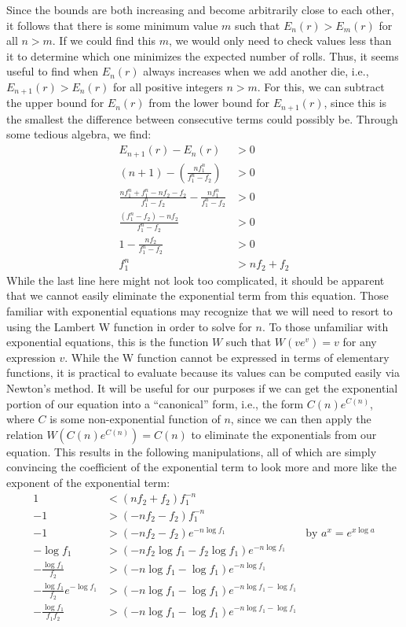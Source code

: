 \documentclass{article}
\begin{document}
Since the bounds are both increasing and become arbitrarily close to each other, it follows that there is some minimum value $m$ such that $E_n(r) > E_m(r)$ for all $n > m$.
If we could find this $m$, we would only need to check values less than it to determine which one minimizes the expected number of rolls.
Thus, it seems useful to find when $E_n(r)$ always increases when we add another die, i.e., $E_{n+1}(r) > E_n(r)$ for all positive integers $n > m$.
For this, we can subtract the upper bound for $E_n(r)$ from the lower bound for $E_{n+1}(r)$, since this is the smallest the difference between consecutive terms could possibly be.
Through some tedious algebra, we find:
\begin{align}
    E_{n+1}(r) - E_n(r) &> 0 \\
    (n + 1) - \left( \frac{nf_1^n}{f_1^n - f_2} \right) &> 0 \\
    \frac{nf_1^n + f_1^n-nf_2-f_2}{f_1^n-f_2} - \frac{nf_1^n}{f_1^n - f_2} &> 0 \\
    \frac{(f_1^n-f_2) - nf_2}{f_1^n-f_2} &> 0 \\
    1 - \frac{nf_2}{f_1^n-f_2} &> 0 \\
    f_1^n &>nf_2 + f_2
\end{align}
While the last line here might not look too complicated, it should be apparent that we cannot easily eliminate the exponential term from this equation.
Those familiar with exponential equations may recognize that we will need to resort to using the Lambert W function in order to solve for $n$.
To those unfamiliar with exponential equations, this is the function $W$ such that $W(ve^v)=v$ for any expression $v$. 
While the W function cannot be expressed in terms of elementary functions, it is practical to evaluate because its values can be computed easily via Newton's method.
It will be useful for our purposes if we can get the exponential portion of our equation into a ``canonical'' form, i.e., the form $C(n)e^{C(n)}$, where $C$ is some non-exponential function of $n$, since we can then apply the relation $W(C(n)e^{C(n)})=C(n)$ to eliminate the exponentials from our equation.
This results in the following manipulations, all of which are simply convincing the coefficient of the exponential term to look more and more like the exponent of the exponential term:
\begin{align}
    1 &< (nf_2+f_2)f_1^{-n} \\
    -1 &> (-nf_2-f_2)f_1^{-n} \\
    -1 &> (-nf_2-f_2)e^{-n\log{f_1}} & \text{by } a^x=e^{x\log{a}}\\
    -\log{f_1} &> (-nf_2\log{f_1}-f_2\log{f_1})e^{-n\log{f_1}}\\
    -\frac{\log{f_1}}{f_2} &> (-n\log{f_1}-\log{f_1})e^{-n\log{f_1}}\\
    -\frac{\log{f_1}}{f_2}e^{-\log{f_1}} &> (-n\log{f_1}-\log{f_1})e^{-n\log{f_1}-\log{f_1}}\\
    -\frac{\log{f_1}}{f_1f_2} &> (-n\log{f_1}-\log{f_1})e^{-n\log{f_1}-\log{f_1}}
\end{align}
\end{document}
